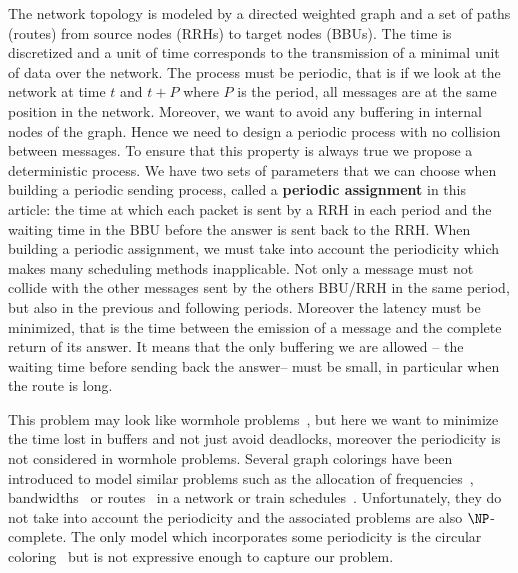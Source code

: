 \documentclass[a4paper,10pt]{article}
\begin{document}
 
 The network topology is modeled by a directed weighted graph and a set of paths (routes) from source nodes (RRHs) to target nodes (BBUs). The time is discretized and a unit of time corresponds to the transmission of a minimal unit of data over the network.
 The process must be periodic, that is if we look at the network at time $t$ and $t+P$ where $P$ is the period, all messages are at the same position in the network. Moreover, we want to avoid any  buffering in internal nodes of the graph. Hence we need to design 
 a periodic process with no collision between messages. To ensure that this property is always true we propose a deterministic process.  We have two sets of parameters that we can choose when building a periodic sending process, called a \textbf{periodic assignment} in this article: the time at which each packet is sent by a RRH in each period and the waiting time in the BBU before the answer is sent back to the RRH. When building a periodic assignment, we must take into account the periodicity which makes many scheduling methods inapplicable. Not only a message must not collide with the other messages sent by the others BBU/RRH in the same period, but also in the previous and following periods. Moreover the latency must be minimized, that is the time 
 between the emission of a message and the complete return of its answer. It means that the only buffering we are allowed -- the waiting time before sending back the answer-- must be small, in particular when the route is long.
 
This problem may look like wormhole problems~\cite{cole1996benefit}, but here we want to minimize the time lost in buffers and not just avoid deadlocks, moreover the periodicity is not considered in wormhole problems. Several graph colorings have been introduced to model similar problems such as the allocation of frequencies~\cite{borndorfer1998frequency}, bandwidths~\cite{erlebach2001complexity} or routes~\cite{cole1996benefit} in a network or train schedules~\cite{strotmann2007railway}. Unfortunately, they do not take into account the periodicity and the associated problems are also $\NP$-complete. The only model which incorporates some periodicity is the circular coloring~\cite{zhou2013multiple, zhu2001circular,zhu2006recent} but is not expressive enough to capture our problem.
\end{document}
